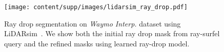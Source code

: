 \begin{figure}[t]
\centering
\texttt{[image: content/supp/images/lidarsim\_ray\_drop.pdf]}

\caption{Ray drop segmentation on \textit{Waymo Interp.} dataset using LiDARsim~\cite{manivasagam2020lidarsim}. We show both the initial ray drop mask from ray-surfel query and the refined masks using learned ray-drop model.}
\label{fig:supp_lidarsim_raydrop}

\end{figure}